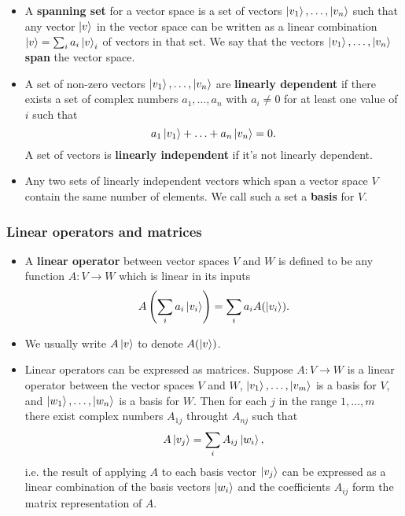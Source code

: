 \documentclass{article}
\begin{document}
\begin{itemize}
  \item A \textbf{spanning set} for a vector space is a set of vectors $\ket{v_1}, \ldots, \ket{v_n}$ such that any vector $\ket{v}$ in the vector space can be written as a linear combination $\ket{v} = \sum_i a_i \ket{v}_i$ of vectors in that set. We say that the vectors $\ket{v_1}, \ldots, \ket{v_n}$ \textbf{span} the vector space.

  \item A set of non-zero vectors $\ket{v_1}, \ldots, \ket{v_n}$ are \textbf{linearly dependent} if there exists a set of complex numbers $a_1, \ldots, a_n$ with $a_i \ne 0$ for at least one value of $i$ such that \[a_1 \ket{v_1} + \ldots + a_n \ket{v_n} = 0.\] A set of vectors is \textbf{linearly independent} if it's not linearly dependent.

  \item Any two sets of linearly independent vectors which span a vector space $V$ contain the same number of elements. We call such a set a \textbf{basis} for $V$.
\end{itemize}

\subsubsection{Linear operators and matrices}

\begin{itemize}
  \item A \textbf{linear operator} between vector spaces $V$ and $W$ is defined to be any function $A : V \rightarrow W$ which is linear in its inputs \[A \left( \sum_i a_i \ket{v_i} \right) = \sum_i a_i A(\ket{v_i}).\]

  \item We usually write $A \ket{v}$ to denote $A(\ket{v})$.

  \item Linear operators can be expressed as matrices. Suppose $A : V \rightarrow W$ is a linear operator between the vector spaces $V$ and $W$, $\ket{v_1}, \ldots, \ket{v_m}$ is a basis for $V$, and $\ket{w_1}, \ldots, \ket{w_n}$ is a basis for $W$. Then for each $j$ in the range $1, \ldots, m$ there exist complex numbers $A_{1 j}$ throught $A_{n j}$ such that \[A \ket{v_j} = \sum_i A_{i j} \ket{w_i},\] i.e. the result of applying $A$ to each basis vector $\ket{v_j}$ can be expressed as a linear combination of the basis vectors $\ket{w_i}$ and the coefficients $A_{i j}$ form the matrix representation of $A$.
\end{itemize}
\end{document}
